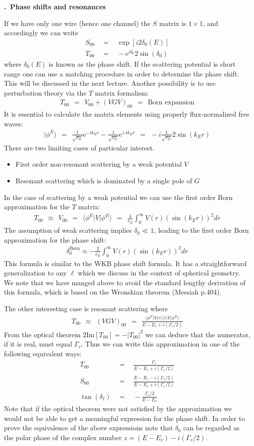 \documentclass[onecolumn,fleqn, 11pt]{revtex4}
\newcommand{\im}{\mathrm{Im}}
\newcommand{\eexp}{\mathrm{e}^}
\newcommand{\tbox}[1]{\text{#1}}
\newcommand{\beq}{\begin{eqnarray}}
\newcommand{\eeq}{\end{eqnarray}}
\renewcommand{\thesubsection}{\arabic{subsection}}
\renewcommand{\thesubsubsection}{\arabic{subsubsection}}
\newcommand{\sheadC}[1]
{
\addtocounter{subsubsection}{1}
\vspace{5mm}
{\bf \thesubsection.\thesubsubsection \ #1}  
\nopagebreak
\phantomsection
}
\begin{document}
\sheadC{Phase shifts and resonances}


If we have only one wire (hence one channel) 
the $S$ matrix is ${1\times1}$, and accordingly 
we can write 
\beq
S_{00} \ \ &=& \ \ \exp[i2\delta_0(E)] \\
T_{00} \ \ &=& \ \ -\eexp{i\delta_{0}} 2\sin(\delta_{0})
\eeq     
where $\delta_0(E)$ is known as the phase shift. 
If the scattering potential is short range one 
can use a matching procedure in order to determine 
the phase shift. This will be discussed in the next 
lecture. Another possibility is to use perturbation 
theory via the $T$ matrix formalism:
\beq
T_{00} \ \ = \ \ V_{00} + (VGV)_{00} \ \ = \ \ \mbox{Born expansion}
\eeq     
It is essential to calculate the matrix elements 
using properly flux-normalized free waves:
\beq 
|\phi^{E}\rangle 
\ \ = \ \ 
\frac{1}{\sqrt{v_E}}\eexp{-ik_Er} - \frac{1}{\sqrt{v_E}}\eexp{+ik_Er} 
\ \ = \ \
-i \frac{1}{\sqrt{v_E}} 2\sin(k_Er) 
\eeq
There are two limiting cases of particular interest.  
\begin{itemize}
\setlength{\itemsep}{0mm}
\item 
First order non-resonant scattering by a weak potential $V$  
\item
Resonant scattering which is dominated by a single pole of $G$  
\end{itemize}
In the case of scattering by a weak potential 
we can use the first order Born approximation 
for the $T$ matrix: 
\beq
T_{00} 
\ \ \approx \ \  
V_{00} 
\ \ = \ \ 
\langle \phi^{E} | V |  \phi^{E} \rangle
\ \ = \ \ 
\frac{4}{v_E} \int_{0}^{\infty} V(r)\left(\sin(k_Er)\right)^2 dr 
\eeq
The assumption of weak scattering 
implies $\delta_{0} \ll 1$, leading to the 
first order Born approximation for the phase shift: 
\beq
\delta^{\tbox{Born}}_{0} \approx
-\frac{2}{v_E} \int_{0}^{\infty} V(r)\left(\sin(k_Er)\right)^2 dr 
\eeq
This formula is similar to the WKB phase shift formula. 
It has a straightforward generalization to any $\ell$ 
which we discuss in the context of spherical geometry.   
We note that we have manged above to avoid the standard 
lengthy derivation of this formula, 
which is based on the Wronskian theorem (Messiah p.404).


The other interesting case is resonant scattering where 
\beq
T_{00} \ \  \approx \ \ (VGV)_{00}
\ \ = \ \ 
\frac{ \langle \phi^{E} | V | r \rangle \langle \tilde{r} | V | \phi^{E} \rangle }
{E-E_{r}+i(\Gamma_{r}/2)}
\eeq
From the optical theorem $2\im[T_{00}]=-|T_{00}|^{2}$  
we can deduce that the numerator, if it is real,  
must equal $\Gamma_r$. 
Thus we can write this approximation 
in one of the following equivalent ways:  
\beq
T_{00} \ \ &=& \ \ \frac{\Gamma_{r}}{E-E_{r}+i(\Gamma_{r}/2)}
\\
S_{00} \ \ &=& \ \ \frac{E-E_{r}-i(\Gamma_{r}/2)}{E-E_{r}+i(\Gamma_{r}/2)}
\\ 
\tan(\delta_{\ell}) \ \ &=& \ \ -\frac{\Gamma_r/2}{E-E_r}
\eeq
Note that if the optical 
theorem were not satisfied 
by the approximation 
we would not be able 
to get a meaningful expression 
for the phase shift.   
In order to prove the equivalence 
of the above expressions note 
that $\delta_0$ can be regarded  
as the polar phase of the complex 
number ${z= (E{-}E_{r})-i(\Gamma_{r}/2)}$.
\end{document}

